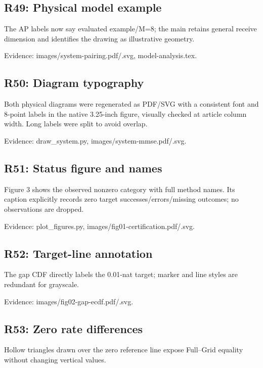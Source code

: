 \documentclass[10pt]{article}
\begin{document}
\subsection*{R49: Physical model example}

The AP labels now say evaluated example/\allowbreak M=8; the main retains general receive dimension and identifies the drawing as illustrative geometry.

{\small Evidence: images/\allowbreak system-pairing.pdf/\allowbreak .svg, model-analysis.tex.}

\subsection*{R50: Diagram typography}

Both physical diagrams were regenerated as PDF/\allowbreak SVG with a consistent font and 8-point labels in the native 3.25-inch figure, visually checked at article column width. Long labels were split to avoid overlap.

{\small Evidence: draw\_\allowbreak system.py, images/\allowbreak system-mmse.pdf/\allowbreak .svg.}

\subsection*{R51: Status figure and names}

Figure 3 shows the observed nonzero category with full method names. Its caption explicitly records zero target successes/\allowbreak errors/\allowbreak missing outcomes; no observations are dropped.

{\small Evidence: plot\_\allowbreak figures.py, images/\allowbreak fig01-certification.pdf/\allowbreak .svg.}

\subsection*{R52: Target-line annotation}

The gap CDF directly labels the 0.01-nat target; marker and line styles are redundant for grayscale.

{\small Evidence: images/\allowbreak fig02-gap-ecdf.pdf/\allowbreak .svg.}

\subsection*{R53: Zero rate differences}

Hollow triangles drawn over the zero reference line expose Full--Grid equality without changing vertical values.
\end{document}
